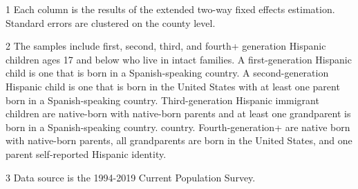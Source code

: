 \begin{table}[H]
{\begin{threeparttable}
\begin{tabular}[t]{lcccccccc}
\end{tabular}
\begin{tablenotes}
\small
\item[1] \footnotesize{Each column is the results of the extended two-way fixed effects estimation. 
                      Standard errors are clustered on the county level.}
\item[2] \footnotesize{The samples include first, second, third, and fourth+ generation Hispanic children ages 17 and below who live in intact families. 
                      A first-generation Hispanic child is one that is born in a Spanish-speaking country. 
                      A second-generation Hispanic child is one that is born in the United States with at least one parent born in a Spanish-speaking country.
                      Third-generation Hispanic immigrant children are native-born with native-born parents and at least one grandparent is born in a Spanish-speaking country.
                      country.
                      Fourth-generation+ are native born with native-born parents, all grandparents are born in the United States, and one parent self-reported Hispanic identity.}
\item[3] \footnotesize{Data source is the 1994-2019 Current Population Survey.}
\end{tablenotes}
\end{threeparttable}}
\end{table}
